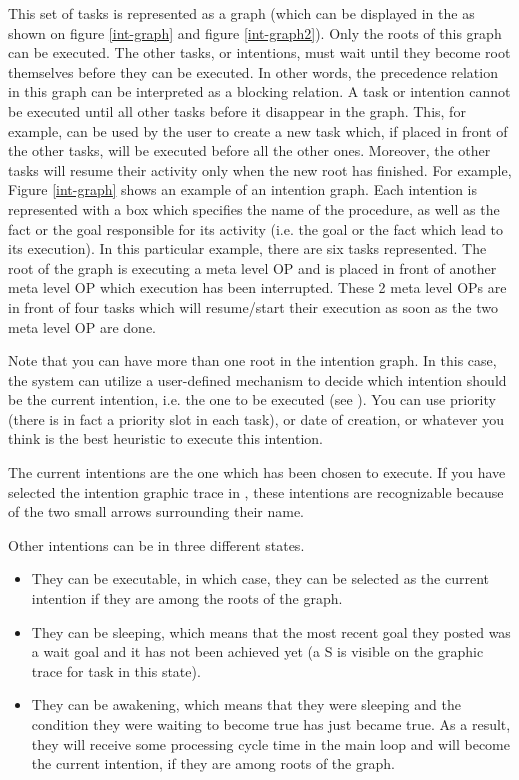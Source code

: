 This set of tasks is represented as a graph (which can be displayed in the
\XOPRS{} as shown on figure \ref{int-graph} and figure \ref{int-graph2}). Only
the roots of this graph can be executed. The other tasks, or intentions, must
wait until they become root themselves before they can be executed. In other
words, the precedence relation in this graph can be interpreted as a blocking
relation. A task or intention cannot be executed until all other tasks before
it disappear in the graph.  This, for example, can be used by the user to
create a new task which, if placed in front of the other tasks, will be
executed before all the other ones.  Moreover, the other tasks will resume
their activity only when the new root has finished. For example, Figure
\ref{int-graph} shows an example of an intention graph. Each intention is
represented with a box which specifies the name of the procedure, as well as
the fact or the goal responsible for its activity (i.e. the goal or the fact
which lead to its execution). In this particular example, there are six tasks
represented. The root of the graph is executing a meta level OP and is placed
in front of another meta level OP which execution has been interrupted. These 2
meta level OPs are in front of four tasks which will resume/start their
execution as soon as the two meta level OP are done.

Note that you can have more than one root in the intention graph. In this
case, the system can utilize a user-defined mechanism to decide which
intention should be the current intention, i.e. the one to be executed
(see ). You can use priority
(there is in fact a priority slot in each task), or date of creation, or
whatever you think is the best heuristic to execute this intention.

The current intentions are the one which has been chosen to execute. If
you have selected the intention graphic trace in \XPK{}, these intentions
are recognizable because of the two small arrows surrounding their name.

Other intentions can be in three different states.

\begin{itemize}

\item They can be executable, in which case, they can be selected as the
current intention if they are among the roots of the graph.

\item They can be sleeping, which means that the most recent goal they
posted was a wait goal and it has not been achieved yet (a S is visible on
the graphic trace for task in this state).


\item They can be awakening, which means that they were sleeping and the
condition they were waiting to become true has just became true. As a result, they will 
receive some processing cycle time in the main loop and will become the current
intention, if they are among roots of the graph.

\end{itemize}

